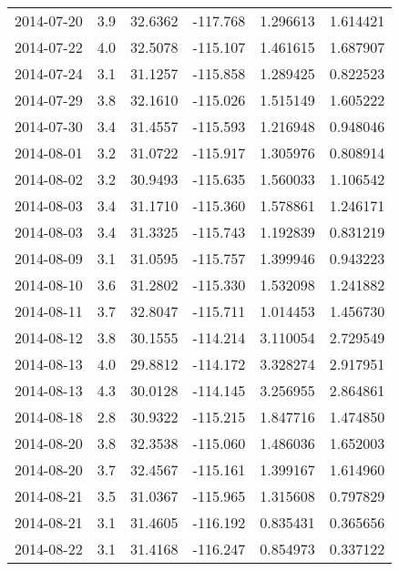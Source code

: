 \begin{tabular}{lrrrrr}
2014-07-20 &       3.9 &  32.6362 &  -117.768 &         1.296613 &         1.614421 \\
2014-07-22 &       4.0 &  32.5078 &  -115.107 &         1.461615 &         1.687907 \\
2014-07-24 &       3.1 &  31.1257 &  -115.858 &         1.289425 &         0.822523 \\
2014-07-29 &       3.8 &  32.1610 &  -115.026 &         1.515149 &         1.605222 \\
2014-07-30 &       3.4 &  31.4557 &  -115.593 &         1.216948 &         0.948046 \\
2014-08-01 &       3.2 &  31.0722 &  -115.917 &         1.305976 &         0.808914 \\
2014-08-02 &       3.2 &  30.9493 &  -115.635 &         1.560033 &         1.106542 \\
2014-08-03 &       3.4 &  31.1710 &  -115.360 &         1.578861 &         1.246171 \\
2014-08-03 &       3.4 &  31.3325 &  -115.743 &         1.192839 &         0.831219 \\
2014-08-09 &       3.1 &  31.0595 &  -115.757 &         1.399946 &         0.943223 \\
2014-08-10 &       3.6 &  31.2802 &  -115.330 &         1.532098 &         1.241882 \\
2014-08-11 &       3.7 &  32.8047 &  -115.711 &         1.014453 &         1.456730 \\
2014-08-12 &       3.8 &  30.1555 &  -114.214 &         3.110054 &         2.729549 \\
2014-08-13 &       4.0 &  29.8812 &  -114.172 &         3.328274 &         2.917951 \\
2014-08-13 &       4.3 &  30.0128 &  -114.145 &         3.256955 &         2.864861 \\
2014-08-18 &       2.8 &  30.9322 &  -115.215 &         1.847716 &         1.474850 \\
2014-08-20 &       3.8 &  32.3538 &  -115.060 &         1.486036 &         1.652003 \\
2014-08-20 &       3.7 &  32.4567 &  -115.161 &         1.399167 &         1.614960 \\
2014-08-21 &       3.5 &  31.0367 &  -115.965 &         1.315608 &         0.797829 \\
2014-08-21 &       3.1 &  31.4605 &  -116.192 &         0.835431 &         0.365656 \\
2014-08-22 &       3.1 &  31.4168 &  -116.247 &         0.854973 &         0.337122 \\

\end{tabular}
